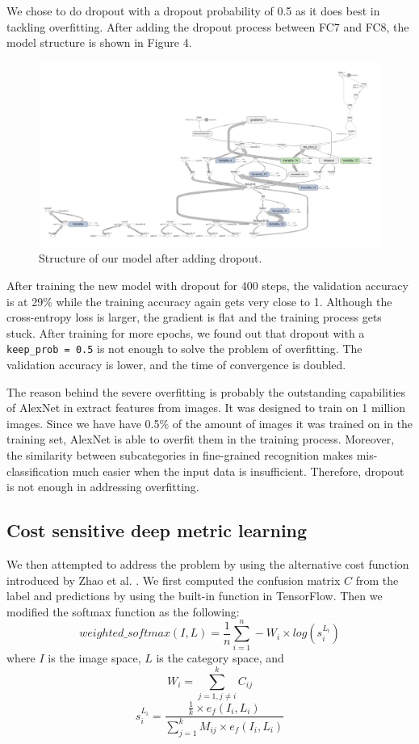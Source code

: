 \documentclass[letterpaper, 12pt]{article}
\begin{document}
We chose to do dropout with a dropout probability of 0.5 as it does best in tackling overfitting.
After adding the dropout process between FC7 and FC8, the model structure is shown in Figure 4.
\begin{figure}
    \begin{center}
        \includegraphics[width=\textwidth]{structure}
        \caption{Structure of our model after adding dropout.}
    \end{center}
\end{figure}
After training the new model with dropout for 400 steps, the validation accuracy is at 29\% while the training accuracy again
gets very close to 1. Although the cross-entropy loss is larger, the gradient is flat and the training process gets stuck.
After training for more epochs, we found out that dropout with a \texttt{keep\_prob = 0.5} is not enough to solve the problem of
overfitting. The validation accuracy is lower, and the time of convergence is doubled.

The reason behind the severe overfitting is probably the outstanding capabilities of AlexNet in extract features from images. It was
designed to train on 1 million images. Since we have have 0.5\% of the amount of images it was trained on in the training set, AlexNet
is able to overfit them in the training process. Moreover, the similarity between subcategories in fine-grained recognition makes
mis-classification much easier when the input data is insufficient. Therefore, dropout is not enough in addressing overfitting.

\subsection{Cost sensitive deep metric learning}
We then attempted to address the problem by using the alternative cost function introduced by Zhao et al. \cite{Zhao}.
We first computed the confusion matrix $C$ from the label and predictions by using the built-in function in TensorFlow. Then we modified
the softmax function as the following:
$$weighted\_softmax(I,L)=\frac{1}{n}\sum^n_{i=1}-W_i\times log(s_i^{L_i})$$
where $I$ is the image space, $L$ is the category space, and
$$W_i=\sum^k_{j=1,j\not =i}C_{ij}$$
$$s_i^{L_i}=\frac{\frac{1}{k}\times e_f(I_i,L_i)}{\sum^k_{j=1}M_{ij}\times e_f(I_i,L_i)}$$
\end{document}
